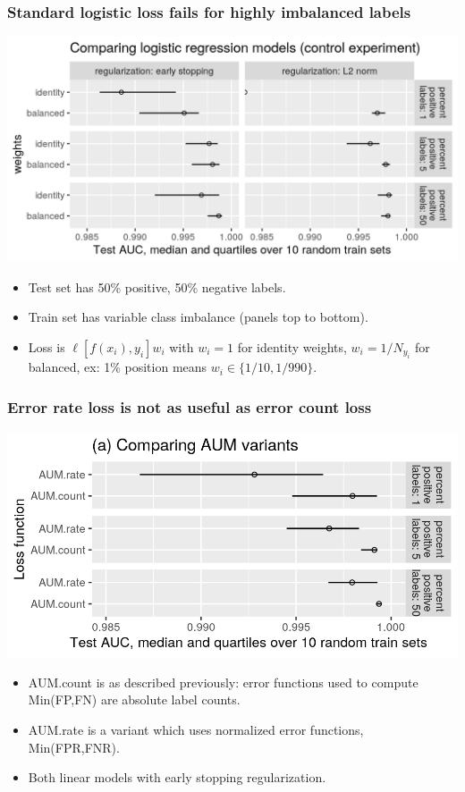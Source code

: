 \documentclass{beamer}
\begin{document}
\begin{frame}
  \frametitle{Standard logistic loss fails for highly imbalanced labels}

 \includegraphics[width=\textwidth]{figure-unbalanced-grad-desc-logistic.png}

 \begin{itemize}
 \item Test set has 50\% positive, 50\% negative labels.
 \item Train set has variable class imbalance (panels top to
   bottom).
 \item Loss is $\ell[f(x_i), y_i]w_i$ with $w_i=1$ for identity
   weights, $w_i=1/N_{y_i}$ for balanced, ex: 1\% position means
   $w_i\in\{1/10,1/990\}$.
 \end{itemize}

\end{frame}


\begin{frame}
  \frametitle{Error rate loss is not as useful as error count loss}

 \includegraphics[width=\textwidth]{figure-unbalanced-grad-desc-aum.png}

 \begin{itemize}
 \item AUM.count is as described previously: error functions used to
   compute Min(FP,FN) are absolute label counts.
 \item AUM.rate is a variant which uses normalized error functions,
   Min(FPR,FNR).
 \item Both linear models with early stopping regularization.
 \end{itemize}

\end{frame}
\end{document}
